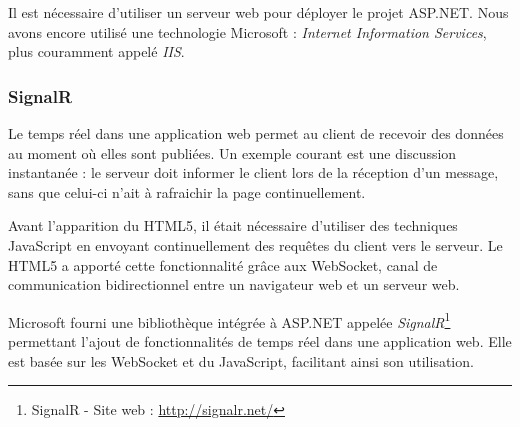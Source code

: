 Il est nécessaire d'utiliser un serveur web pour déployer le projet ASP.NET.
Nous avons encore utilisé une technologie Microsoft : \textit{Internet Information Services}, plus couramment appelé \textit{IIS}.


\subsubsection{SignalR}

Le temps réel dans une application web permet au client de recevoir des données au moment où elles sont publiées.
Un exemple courant est une discussion instantanée : le serveur doit informer le client lors de la réception d'un message, sans que celui-ci n'ait à rafraichir la page continuellement.

Avant l'apparition du HTML5, il était nécessaire d'utiliser des techniques JavaScript en envoyant continuellement des requêtes du client vers le serveur.
Le HTML5 a apporté cette fonctionnalité grâce aux WebSocket, canal de communication bidirectionnel entre un navigateur web et un serveur web.

Microsoft fourni une bibliothèque intégrée à ASP.NET appelée \textit{SignalR}\footnote{SignalR - Site web : \url{http://signalr.net/}} permettant l'ajout de fonctionnalités de temps réel dans une application web.
Elle est basée sur les WebSocket et du JavaScript, facilitant ainsi son utilisation.